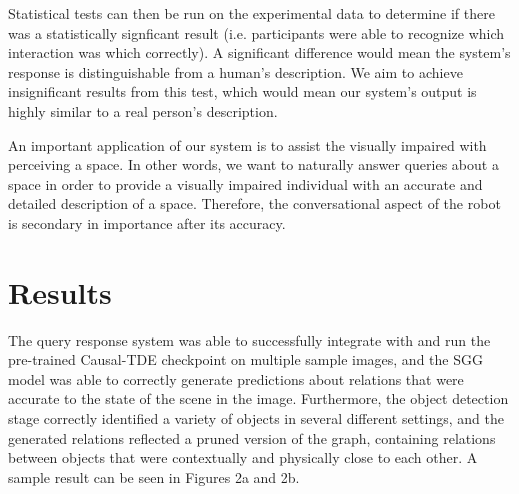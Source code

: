 \documentclass[letterpaper, 10 pt, conference]{ieeeconf}  %
\begin{document}
    Statistical tests can then be run on the experimental data to determine if there was a statistically signficant result (i.e. participants were able to recognize which interaction was which correctly). A significant difference would mean the system's response is distinguishable from a human's description. We aim to achieve insignificant results from this test, which would mean our system's output is highly similar to a real person's description.

    An important application of our system is to assist the visually impaired with perceiving a space. In other words, we want to naturally answer queries about a space in order to provide a visually impaired individual with an accurate and detailed description of a space. Therefore, the conversational aspect of the robot is secondary in importance after its accuracy.


\section{Results}
The query response system was able to successfully integrate with and run the pre-trained Causal-TDE checkpoint on multiple sample images, and the SGG model was able to correctly generate predictions about relations that were accurate to the state of the scene in the image. Furthermore, the object detection stage correctly identified a variety of objects in several different settings, and the generated relations reflected a pruned version of the graph, containing relations between objects that were contextually and physically close to each other. A sample result can be seen in Figures 2a and 2b.
\end{document}
